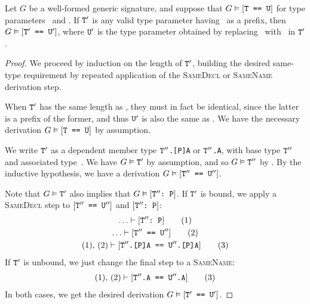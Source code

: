 \documentclass[../generics]{subfiles}
\begin{document}
\begin{lemma}\label{general member type}
Let $G$ be a well-formed generic signature, and suppose that $G\vDash[\texttt{T == U}]$ for type parameters \tT\ and \tU. If $\texttt{T}^\prime$ is any valid type parameter having \tT\ as a prefix, then $G\vDash[\texttt{$\texttt{T}^\prime$ == $\texttt{U}^\prime$}]$, where $\texttt{U}^\prime$ is the type parameter obtained by replacing \tT\ with \tU\ in $\texttt{T}^\prime$.
\end{lemma}
\begin{proof}
We proceed by induction on the length of $\texttt{T}^\prime$, building the desired same-type requirement by repeated application of the \textsc{SameDecl} or \textsc{SameName} derivation step.

\BaseCase When $\texttt{T}^\prime$ has the same length as \tT, they must in fact be identical, since the latter is a prefix of the former, and thus $\texttt{U}^\prime$ is also the same as \tU. We have the necessary derivation $G\vDash[\texttt{T == U}]$ by assumption.

\InductiveStep We write $\texttt{T}^\prime$ as a dependent member type \texttt{$\texttt{T}^{\prime\prime}$.[P]A} or \texttt{$\texttt{T}^{\prime\prime}$.A}, with base type $\texttt{T}^{\prime\prime}$ and associated type~\nA. We have $G\vDash\texttt{T}^\prime$ by assumption, and so $G\vDash\texttt{T}^{\prime\prime}$ by . By the inductive hypothesis, we have a derivation $G\vDash[\texttt{$\texttt{T}^{\prime\prime}$ == $\texttt{U}^{\prime\prime}$}]$.

Note that $G\vDash\texttt{T}^\prime$ also implies that $G\vDash[\texttt{$\texttt{T}^{\prime\prime}$:~P}]$. If $\texttt{T}^\prime$ is bound, we apply a \textsc{SameDecl} step to $[\texttt{$\texttt{T}^{\prime\prime}$ == $\texttt{U}^{\prime\prime}$}]$ and $[\texttt{$\texttt{T}^{\prime\prime}$:~P}]$:
\begin{gather*}
\ldots\vdash[\texttt{$\texttt{T}^{\prime\prime}$:~P}]\tag{1}\\
\ldots\vdash[\texttt{$\texttt{T}^{\prime\prime}$ == $\texttt{U}^{\prime\prime}$}]\tag{2}\\
(1),\,(2)\vdash[\texttt{$\texttt{T}^{\prime\prime}$.[P]A == $\texttt{U}^{\prime\prime}$.[P]A}]\tag{3}
\end{gather*}
If $\texttt{T}^\prime$ is unbound, we just change the final step to a \textsc{SameName}:
\begin{gather*}
(1),\,(2)\vdash[\texttt{$\texttt{T}^{\prime\prime}$.A == $\texttt{U}^{\prime\prime}$.A}]\tag{3}
\end{gather*}
In both cases, we get the desired derivation $G\vDash[\texttt{$\texttt{T}^\prime$ == $\texttt{U}^\prime$}]$.
\end{proof}
\end{document}
